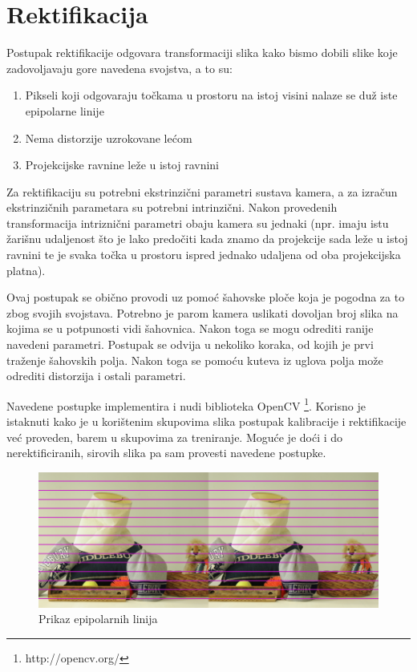 \documentclass[utf8, zavrsni, numeric]{fer}
\begin{document}
\section{Rektifikacija}
Postupak rektifikacije odgovara transformaciji slika kako bismo dobili slike koje zadovoljavaju gore navedena svojstva, a to su:
\begin{enumerate}
  \item Pikseli koji odgovaraju točkama u prostoru na istoj visini nalaze se duž iste epipolarne linije
  \item Nema distorzije uzrokovane lećom
  \item Projekcijske ravnine leže u istoj ravnini
\end{enumerate}
Za rektifikaciju su potrebni ekstrinzični parametri sustava kamera, a za izračun ekstrinzičnih parametara su potrebni intrinzični.
Nakon provedenih transformacija intriznični parametri obaju kamera su jednaki (npr. imaju istu žarišnu udaljenost što je lako predočiti kada znamo da projekcije sada leže u istoj ravnini te je svaka točka
u prostoru ispred jednako udaljena od oba projekcijska platna).

Ovaj postupak se obično provodi uz pomoć šahovske ploče koja je pogodna za to zbog svojih svojstava. Potrebno je parom kamera uslikati dovoljan broj slika na kojima se u potpunosti vidi šahovnica.
Nakon toga se mogu odrediti ranije navedeni parametri. Postupak se odvija u nekoliko koraka, od kojih je prvi traženje šahovskih polja. Nakon toga se pomoću kuteva iz uglova polja može odrediti distorzija
i ostali parametri.

Navedene postupke implementira i nudi biblioteka OpenCV \footnote{http://opencv.org/}. Korisno je istaknuti kako je u korištenim skupovima slika postupak kalibracije i rektifikacije već proveden, barem u skupovima za treniranje. Moguće je doći i do nerektificiranih, sirovih slika pa sam provesti navedene postupke.

\begin{figure}[htb]
  \centering
  \includegraphics[width=14cm]{img/lines.png}
  \caption{Prikaz epipolarnih linija}
  \label{fig:epipolarne_linije}
\end{figure}
\end{document}
